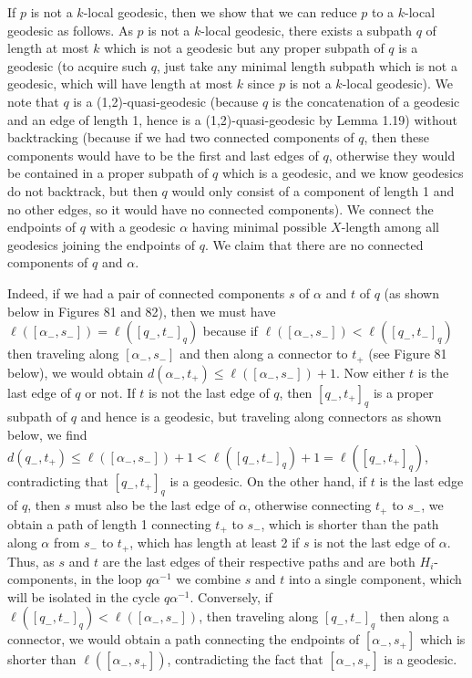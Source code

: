 \documentclass[12pt]{article}
\newcommand{\vs}{\vskip10pt}
\begin{document}
	If $p$ is not a $k$-local geodesic, then we show that we can reduce $p$ to a $k$-local geodesic as follows. As $p$ is not a $k$-local geodesic, there exists a subpath $q$ of length at most $k$ which is not a geodesic but any proper subpath of $q$ is a geodesic (to acquire such $q$, just take any minimal length subpath which is not a geodesic, which will have length at most $k$ since $p$ is not a $k$-local geodesic). We note that $q$ is a (1,2)-quasi-geodesic (because $q$ is the concatenation of a geodesic and an edge of length 1, hence is a (1,2)-quasi-geodesic by Lemma 1.19) without backtracking (because if we had two connected components of $q$, then these components would have to be the first and last edges of $q$, otherwise they would be contained in a proper subpath of $q$ which is a geodesic, and we know geodesics do not backtrack, but then $q$ would only consist of a component of length 1 and no other edges, so it would have no connected components). We connect the endpoints of $q$ with a geodesic $\alpha$ having minimal possible $X$-length among all geodesics joining the endpoints of $q$. We claim that there are no connected components of $q$ and $\alpha$. 
	
	\vs
	
Indeed, if we had a pair of connected components $s$ of $\alpha$ and $t$ of $q$ (as shown below in Figures 81 and 82), then we must have $\ell([\alpha_-, s_-]) = \ell([q_-, t_-]_q)$ because if $\ell([\alpha_-, s_-]) < \ell([q_-, t_-]_q)$ then traveling along $[\alpha_-, s_-]$ and then along a connector to $t_+$ (see Figure 81 below), we would obtain $d(\alpha_-, t_+) \leq \ell([\alpha_-, s_-]) + 1$. Now either $t$ is the last edge of $q$ or not. If $t$ is not the last edge of $q$, then $[q_-, t_+]_q$ is a proper subpath of $q$ and hence is a geodesic, but traveling along connectors as shown below, we find $d(q_-, t_+) \leq \ell([\alpha_-, s_-]) + 1 < \ell([q_-, t_-]_q) + 1 = \ell([q_-, t_+]_q)$, contradicting that $[q_-, t_+]_q$ is a geodesic. On the other hand, if $t$ is the last edge of $q$, then $s$ must also be the last edge of $\alpha$, otherwise connecting $t_+$ to $s_-$, we obtain a path of length 1 connecting $t_+$ to $s_-$, which is shorter than the path along $\alpha$ from $s_-$ to $t_+$, which has length at least 2 if $s$ is not the last edge of $\alpha$. Thus, as $s$ and $t$ are the last edges of their respective paths and are both $H_i$-components, in the loop $q\alpha^{-1}$ we combine $s$ and $t$ into a single component, which will be isolated in the cycle $q \alpha^{-1}$. Conversely, if $\ell([q_-, t_-]_q) < \ell([\alpha_-, s_-])$, then traveling along $[q_-, t_-]_q$ then along a connector, we would obtain a path connecting the endpoints of $[\alpha_-, s_+]$ which is shorter than $\ell([\alpha_-, s_+])$, contradicting the fact that $[\alpha_-, s_+]$ is a geodesic. 
\end{document}
